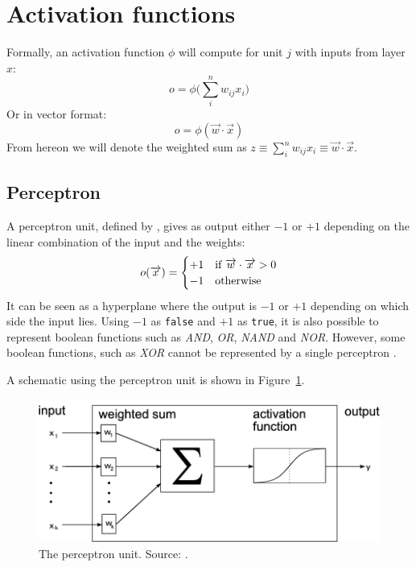 \section{Activation functions} %
\label{sec:activation_functions}
Formally, an activation function $\phi$ will compute for unit $j$ with inputs from layer $x$:
\begin{equation}
    o = \phi\big(\sum_i^n w_{ij} x_i\big)
\end{equation}
Or in vector format:
\begin{equation}
    o = \phi(\overrightarrow{w} \cdot \overrightarrow{x})
\end{equation}
From hereon we will denote the weighted sum as $z \equiv \sum_i^n w_{ij} x_i \equiv \overrightarrow{w} \cdot \overrightarrow{x}$.\\

\subsection{Perceptron} %
\label{ssub:perceptron}
A perceptron unit, defined by \cite{Rosenblatt58}, gives as output either $-1$ or $+1$ depending on the linear combination of the input and the weights:
\begin{equation}
o(\overrightarrow{x}) = \begin{cases}
+1 & \text{if $ \overrightarrow{w} \cdot \overrightarrow{x} > 0$}\\
-1 & \text{otherwise}
\end{cases}
\end{equation}
It can be seen as a hyperplane where the output is $-1$ or $+1$ depending on which side the input lies.
Using $-1$ as \texttt{false} and $+1$ as \texttt{true}, it is also possible to represent boolean functions such as \textit{AND}, \textit{OR}, \textit{NAND} and \textit{NOR}. However, some boolean functions, such as \textit{XOR} cannot be represented by a single perceptron \citep{ML}.

A schematic using the perceptron unit is shown in Figure~\ref{fig:perceptron}.\\
\begin{figure}[htb]
    \centering
    \includegraphics[width=\linewidth]{images/activation_functions/perceptron.png}
    \caption[The perceptron unit]{The perceptron unit. Source: \cite{Demant2013}.}
    \label{fig:perceptron}
\end{figure}

